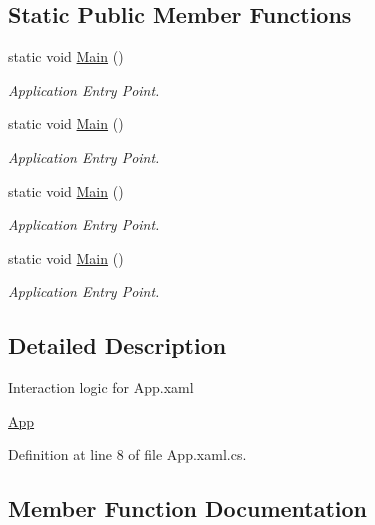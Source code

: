 \subsection*{Static Public Member Functions}
\begin{DoxyCompactItemize}
\item 
static void \hyperlink{class_c_p_u___o_s___simulator_1_1_compiler_tester_1_1_app_ae365e452ae40a08d11e62b034a78b9f2}{Main} ()
\begin{DoxyCompactList}\small\item\em Application Entry Point. \end{DoxyCompactList}\item 
static void \hyperlink{class_c_p_u___o_s___simulator_1_1_compiler_tester_1_1_app_ae365e452ae40a08d11e62b034a78b9f2}{Main} ()
\begin{DoxyCompactList}\small\item\em Application Entry Point. \end{DoxyCompactList}\item 
static void \hyperlink{class_c_p_u___o_s___simulator_1_1_compiler_tester_1_1_app_ae365e452ae40a08d11e62b034a78b9f2}{Main} ()
\begin{DoxyCompactList}\small\item\em Application Entry Point. \end{DoxyCompactList}\item 
static void \hyperlink{class_c_p_u___o_s___simulator_1_1_compiler_tester_1_1_app_ae365e452ae40a08d11e62b034a78b9f2}{Main} ()
\begin{DoxyCompactList}\small\item\em Application Entry Point. \end{DoxyCompactList}\end{DoxyCompactItemize}


\subsection{Detailed Description}
Interaction logic for App.\+xaml 

\hyperlink{class_c_p_u___o_s___simulator_1_1_compiler_tester_1_1_app}{App} 

Definition at line 8 of file App.\+xaml.\+cs.



\subsection{Member Function Documentation}
\hypertarget{class_c_p_u___o_s___simulator_1_1_compiler_tester_1_1_app_a7d535b75c41bf3e0736a88743bec2296}{}
